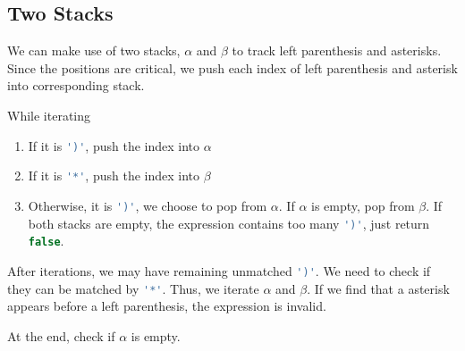 \subsection{Two Stacks}
We can make use of two stacks, $\alpha$ and $\beta$ to track left parenthesis and asterisks. Since the positions are critical, we push each index of left parenthesis and asterisk into corresponding stack.

While iterating 
\begin{enumerate}
\item If it is \lstinline[language=C++, basicstyle=\small\ttfamily, keywordstyle=\bfseries\color{green!40!black}]|')'|, push the index into $\alpha$
\item If it is \lstinline[language=C++, basicstyle=\small\ttfamily, keywordstyle=\bfseries\color{green!40!black}]|'*'|, push the index into $\beta$
\item Otherwise, it is \lstinline[language=C++, basicstyle=\small\ttfamily, keywordstyle=\bfseries\color{green!40!black}]|')'|, we choose to pop from $\alpha$. If $\alpha$ is empty, pop from $\beta$. If both stacks are empty, the expression contains too many \lstinline[language=C++, basicstyle=\small\ttfamily, keywordstyle=\bfseries\color{green!40!black}]|')'|, just return \lstinline[language=C++, basicstyle=\small\ttfamily, keywordstyle=\bfseries\color{green!40!black}]|false|.
\end{enumerate}

After iterations, we may have remaining unmatched \lstinline[language=C++, basicstyle=\small\ttfamily, keywordstyle=\bfseries\color{green!40!black}]|')'|. We need to check if they can be matched by \lstinline[language=C++, basicstyle=\small\ttfamily, keywordstyle=\bfseries\color{green!40!black}]|'*'|. Thus, we iterate $\alpha$ and $\beta$. If we find that a asterisk appears before a left parenthesis, the expression is invalid. 

At the end, check if $\alpha$ is empty. 

